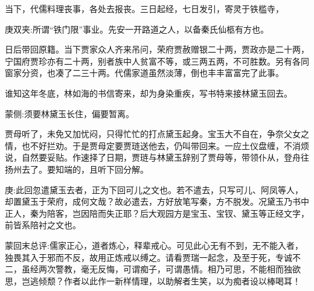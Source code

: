 \begin{parag}
    当下，代儒料理丧事，各处去报丧。三日起经，七日发引，寄灵于铁槛寺，\begin{note}庚双夹:所谓“铁门限”事业。先安一开路道之人，以备秦氏仙柩有方也。\end{note}日后带回原籍。当下贾家众人齐来吊问，荣府贾赦赠银二十两，贾政亦是二十两，宁国府贾珍亦有二十两，别者族中人贫富不等，或三两五两，不可胜数。另有各同窗家分资，也凑了二三十两。代儒家道虽然淡薄，倒也丰丰富富完了此事。
\end{parag}


\begin{parag}
    谁知这年冬底，林如海的书信寄来，却为身染重疾，写书特来接林黛玉回去。\begin{note}蒙侧:须要林黛玉长住，偏要暂离。\end{note}贾母听了，未免又加忧闷，只得忙忙的打点黛玉起身。宝玉大不自在，争奈父女之情，也不好拦劝。于是贾母定要贾琏送他去，仍叫带回来。一应土仪盘缠，不消烦说，自然要妥贴。作速择了日期，贾琏与林黛玉辞别了贾母等，带领仆从，登舟往扬州去了。要知端的，且听下回分解。
\end{parag}


\begin{parag}
    \begin{note}庚:此回忽遣黛玉去者，正为下回可儿之文也。若不遣去，只写可儿、阿凤等人，却置黛玉于荣府，成何文哉？故必遣去，方好放笔写秦，方不脱发。况黛玉乃书中正人，秦为陪客，岂因陪而失正耶？后大观园方是宝玉、宝钗、黛玉等正经文字，前皆系陪衬之文也。\end{note}
\end{parag}


\begin{parag}
    \begin{note}蒙回末总评:儒家正心，道者炼心，释辈戒心。可见此心无有不到，无不能入者，独畏其入于邪而不反，故用正炼戒以缚之。请看贾瑞一起念，及至于死，专诚不二，虽经两次警教，毫无反悔，可谓痴子，可谓愚情。相乃可思，不能相而独欲思，岂逃倾颓？作者以此作一新样情理，以助解者生笑，以为痴者设以棒喝耳！\end{note}
\end{parag}